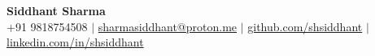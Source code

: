 \documentclass[10pt,a4paper]{article}
\begin{document}
\begin{center}
    \textbf{\LARGE Siddhant Sharma} \\
    \vspace{5pt}
    +91 9818754508 $|$ 
    \href{mailto:sharmasiddhant@proton.me}{sharmasiddhant@proton.me} $|$
    \href{https://github.com/shsiddhant}{github.com/shsiddhant} $|$ \href{https://linkedin.com/in/shsiddhant}{linkedin.com/in/shsiddhant}
\end{center}

\vspace{-10pt}


%








\end{document}
